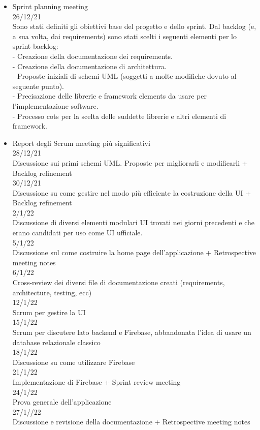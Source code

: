 \documentclass{article}
\begin{document}
\begin{itemize}
\item Sprint planning meeting 
\\26/12/21 
\\Sono stati definiti gli obiettivi base del progetto e dello sprint. Dal backlog (e, a sua volta, dai requirements) sono stati scelti i seguenti elementi per lo sprint backlog:
\\-	Creazione della documentazione dei requirements.
\\-	Creazione della documentazione di architettura.
\\-	Proposte iniziali di schemi UML (soggetti a molte modifiche dovuto al seguente punto).
\\-	Precisazione delle librerie e framework elements da usare per l’implementazione software.
\\-	Processo cots per la scelta delle suddette librerie e altri elementi di framework.

\item Report degli Scrum meeting più significativi
\\28/12/21 
\\Discussione sui primi schemi UML. Proposte per migliorarli e modificarli + Backlog refinement
\\30/12/21
\\Discussione su come gestire nel modo più efficiente la costruzione della UI + Backlog refinement
\\2/1/22
\\Discussione di diversi elementi modulari UI trovati nei giorni precedenti e che erano candidati per uso come UI ufficiale. 
\\5/1/22
\\Discussione sul come costruire la home page dell’applicazione + Retrospective meeting notes
\\6/1/22
\\Cross-review dei diversi file di documentazione creati (requirements, architecture, testing, ecc) 
\\12/1/22
\\Scrum per gestire la UI
\\15/1/22
\\Scrum per discutere lato backend e Firebase, abbandonata l'idea di usare un database relazionale classico
\\18/1/22
\\Discussione su come utilizzare Firebase
\\21/1/22
\\Implementazione di Firebase + Sprint review meeting 
\\24/1/22
\\Prova generale dell'applicazione
\\27/1//22
\\Discussione e revisione della documentazione + Retrospective meeting notes

\end{itemize}
\newpage
\end{document}
